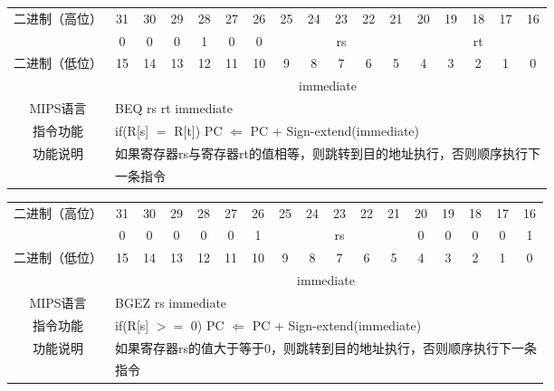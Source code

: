 \clearpage

\begin{table}
\begin{tabular}{|c|c|c|c|c|c|c|c|c|c|c|c|c|c|c|c|c|}
\hline
\multirow{2}{*}{二进制（高位）} &
31&30&29&28&27&26&25&24&23&22&21&20&19&18&17&16\\
\cline{2-17}
&
0&0&0&1&0&
0&
\multicolumn{5}{c|}{rs}&
\multicolumn{5}{c|}{rt}\\
\hline
\multirow{2}{*}{二进制（低位）} &
15&14&13&12&11&10&9&8&7&6&5&4&3&2&1&0\\
\cline{2-17}
&
\multicolumn{16}{c|}{immediate} \\
\hline
MIPS语言&
\multicolumn{16}{l|}{BEQ rs rt immediate}\\
\hline
指令功能&
\multicolumn{16}{l|}{if(R[s] $=$ R[t]) PC $\Leftarrow$ PC + Sign-extend(immediate)}\\
\hline
\multirow{2}{*}{功能说明} &
\multicolumn{16}{l|}{如果寄存器rs与寄存器rt的值相等，则跳转到目的地址执行，否则顺序执行下}\\
&\multicolumn{16}{l|}{一条指令}\\
\hline
\end{tabular}
\end{table}

\begin{table}
\begin{tabular}{|c|c|c|c|c|c|c|c|c|c|c|c|c|c|c|c|c|}
\hline
\multirow{2}{*}{二进制（高位）} &
31&30&29&28&27&26&25&24&23&22&21&20&19&18&17&16\\
\cline{2-17}
&
0&0&0&0&0&
1&
\multicolumn{5}{c|}{rs}&
0&0&0&0&1\\
\hline
\multirow{2}{*}{二进制（低位）} &
15&14&13&12&11&10&9&8&7&6&5&4&3&2&1&0\\
\cline{2-17}
&
\multicolumn{16}{c|}{immediate}\\
\hline
MIPS语言&
\multicolumn{16}{l|}{BGEZ rs immediate}\\
\hline
指令功能&
\multicolumn{16}{l|}{if(R[s] $>=$ 0) PC $\Leftarrow$ PC + Sign-extend(immediate)}\\
\hline
\multirow{2}{*}{功能说明}&
\multicolumn{16}{l|}{如果寄存器rs的值大于等于0，则跳转到目的地址执行，否则顺序执行下一条}\\
&\multicolumn{16}{l|}{指令}\\
\hline
\end{tabular}
\end{table}

